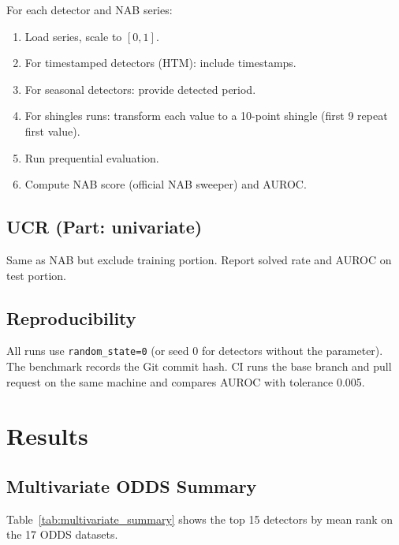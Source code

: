 \documentclass[11pt,a4paper]{article}
\begin{document}
For each detector and NAB series:
\begin{enumerate}
    \item Load series, scale to $[0,1]$.
    \item For timestamped detectors (HTM): include timestamps.
    \item For seasonal detectors: provide detected period.
    \item For shingles runs: transform each value to a 10-point shingle (first 9 repeat first value).
    \item Run prequential evaluation.
    \item Compute NAB score (official NAB sweeper) and AUROC.
\end{enumerate}

\subsection{UCR (Part: univariate)}
\label{sec:proto_ucr}

Same as NAB but exclude training portion. Report solved rate and AUROC on test portion.

\subsection{Reproducibility}
\label{sec:repro}

All runs use \texttt{random\_state=0} (or seed 0 for detectors without the parameter). The benchmark records the Git commit hash. CI runs the base branch and pull request on the same machine and compares AUROC with tolerance 0.005.

\section{Results}
\label{sec:results}

\subsection{Multivariate ODDS Summary}
\label{sec:results_odds}

Table~\ref{tab:multivariate_summary} shows the top 15 detectors by mean rank on the 17 ODDS datasets.
\end{document}
